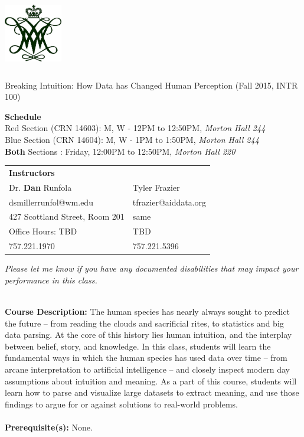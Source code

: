 \documentclass[11pt]{article}
\begin{document}
  \begin{center}

{\includegraphics[height=1.25in,width=1in]{wmchiffre1.jpg}} 

\LARGE Breaking Intuition: How Data has Changed Human Perception (Fall 2015, INTR 100)\\ \vspace{3mm}
\end{center}
\large \textbf{Schedule} \\
\normalsize \color{red}Red \color{black} Section (CRN 14603): M, W - 12PM to 12:50PM, \textit{Morton Hall 244} \\
\color{blue}Blue \color{black} Section (CRN 14604): M, W - 1PM to 1:50PM, \textit{Morton Hall 244} \\
\textbf{Both} \color{black} Sections : Friday, 12:00PM to 12:50PM, \textit{Morton Hall 220} \\
\vspace{2mm}

\begin{table}[ht]
\begin{tabular}{l l}
\large \textbf{Instructors} & \\
\large Dr. \textbf{Dan} Runfola & Tyler Frazier \\
\large dsmillerrunfol@wm.edu  & tfrazier@aiddata.org \\
\large 427 Scottland Street, Room 201 & same \\
\large Office Hours: TBD & TBD \\
\large 757.221.1970 & 757.221.5396 \\
\end{tabular}
\end{table}

\textit{Please let me know if you have any documented disabilities that may impact your performance in this class.}

\textbf {\large \\ Course Description:} The human species has nearly always sought to predict the future – from reading the clouds and sacrificial rites, to statistics and big data parsing. At the core of this history lies human intuition, and the interplay between belief, story, and knowledge. In this class, students will learn the fundamental ways in which the human species has used data over time – from arcane interpretation to artificial intelligence – and closely inspect modern day assumptions about intuition and meaning. As a part of this course, students will learn how to parse and visualize large datasets to extract meaning, and use those findings to argue for or against solutions to real-world problems. \\
\\
\textbf {Prerequisite(s):} None.
\end{document}
